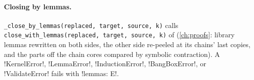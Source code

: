 \paragraph{Closing by lemmas.} \texttt{\_\allowbreak{}close\_\allowbreak{}by\_\allowbreak{}lemmas(\allowbreak{}replaced,\allowbreak{} target,\allowbreak{} source,\allowbreak{} k)} calls \texttt{close\_\allowbreak{}with\_\allowbreak{}lemmas(\allowbreak{}replaced,\allowbreak{} target,\allowbreak{} source,\allowbreak{} k)} of  (\cref{ch:proofs}: library lemmas rewritten on both sides, the other side re-peeled at its chains' last copies, and the parts off the chain cores compared by symbolic contraction). A \py!KernelError!, \py!LemmaError!, \py!InductionError!, \py!BangBoxError!, or \py!ValidateError! fails with \code!lemmas: E!.

